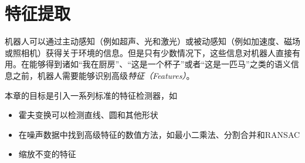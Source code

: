 \chapter{特征提取}
\label{chap:feature_extraction}



机器人可以通过主动感知（例如超声、光和激光）或被动感知（例如加速度、磁场或照相机）获得关于环境的信息。但是只有少数情况下，这些信息对机器人直接有用。在能够得到诸如“我在厨房”、“这是一个杯子”或者“这是一匹马”之类的语义信息之前，机器人需要能够识别高级\emph{特征（Features）}。

本章的目标是引入一系列标准的特征检测器，如

\begin{itemize}

\item 霍夫变换可以检测直线、圆和其他形状
\item 在噪声数据中找到高级特征的数值方法，如最小二乘法、分割合并和RANSAC
\item 缩放不变的特征
\end{itemize}

